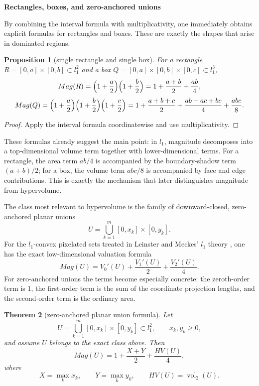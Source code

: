 \documentclass{article}
\def\ell{l}%
\def\HV{HV}%
\def\Mag{Mag}%
\newtheorem{theorem}{Theorem}[section]
\newtheorem{proposition}[theorem]{Proposition}
\theoremstyle{definition}
\newcommand{\Mag}{\operatorname{Mag}}
\newcommand{\HV}{\operatorname{HV}}
\newcommand{\1}{\mathbf{1}}
\newcommand{\vol}{\operatorname{vol}}
\newcommand{\myparagraph}[1]{\medskip\noindent\textbf{#1}}
\begin{document}
\myparagraph{Rectangles, boxes, and zero-anchored unions}

By combining the interval formula with multiplicativity, one immediately obtains explicit formulas for rectangles and boxes. These are exactly the shapes that arise in dominated regions.

\begin{proposition}[single rectangle and single box]
For a rectangle \(R=[0,a]\times[0,b]\subset \ell_1^2\) and a box \(Q=[0,a]\times[0,b]\times[0,c]\subset \ell_1^3\),
\[
\Mag(R)=\Bigl(1+\frac a2\Bigr)\Bigl(1+\frac b2\Bigr)=1+\frac{a+b}{2}+\frac{ab}{4},
\]
\[
\Mag(Q)=\Bigl(1+\frac a2\Bigr)\Bigl(1+\frac b2\Bigr)\Bigl(1+\frac c2\Bigr)
=1+\frac{a+b+c}{2}+\frac{ab+ac+bc}{4}+\frac{abc}{8}.
\]
\end{proposition}

\begin{proof}
Apply the interval formula coordinatewise and use multiplicativity.
\end{proof}

These formulas already suggest the main point: in \(\ell_1\), magnitude decomposes into a top-dimensional volume term together with lower-dimensional terms. For a rectangle, the area term \(ab/4\) is accompanied by the boundary-shadow term \((a+b)/2\); for a box, the volume term \(abc/8\) is accompanied by face and edge contributions. This is exactly the mechanism that later distinguishes magnitude from hypervolume.

The class most relevant to hypervolume is the family of downward-closed, zero-anchored planar unions
\[
U=\bigcup_{k=1}^m [0,x_k]\times[0,y_k].
\]
For the \(\ell_1\)-convex pixelated sets treated in Leinster and Meckes' \(\ell_1\) theory \cite{LeinsterMeckes2017}, one has the exact low-dimensional valuation formula
\[
\Mag(U)=V_0'(U)+\frac{V_1'(U)}{2}+\frac{V_2'(U)}{4}.
\]
For zero-anchored unions the terms become especially concrete: the zeroth-order term is \(1\), the first-order term is the sum of the coordinate projection lengths, and the second-order term is the ordinary area.

\begin{theorem}[zero-anchored planar union formula]\label{thm:planar-dominated-magnitude}
Let
\[
U=\bigcup_{k=1}^m [0,x_k]\times[0,y_k]\subset \ell_1^2,
\qquad x_k,y_k\ge 0,
\]
and assume \(U\) belongs to the exact class above. Then
\[
\Mag(U)=1+\frac{X+Y}{2}+\frac{\HV(U)}{4},
\]
where
\[
X=\max_k x_k,
\qquad
Y=\max_k y_k,
\qquad
\HV(U)=\vol_2(U).
\]
\end{theorem}
\end{document}
